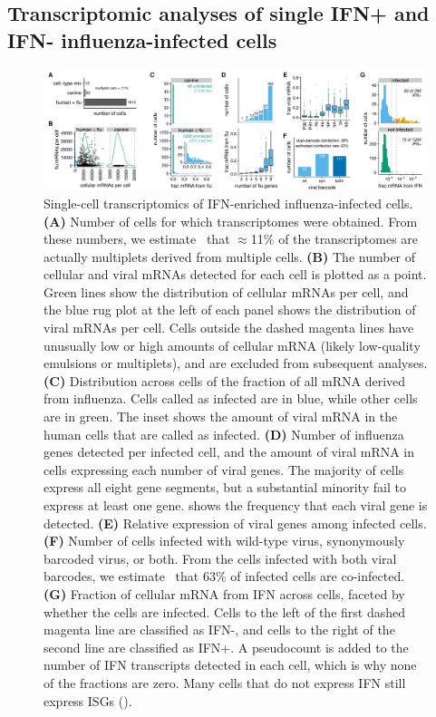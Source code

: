 \documentclass[9pt,lineno]{elife}
\begin{document}
\subsection{Transcriptomic analyses of single IFN+ and IFN- influenza-infected cells}

\begin{figure}
\begin{fullwidth}

\includegraphics[width=\linewidth, clip=false]{figures/single_cell_figures/p_cell_summary.pdf}

\caption{
Single-cell transcriptomics of IFN-enriched influenza-infected cells.
{\bf (A)} 
Number of cells for which transcriptomes were obtained.
From these numbers, we estimate~\citep{bloom2018estimating} that $\approx$11\% of the transcriptomes are actually multiplets derived from multiple cells. 
{\bf (B)} The number of cellular and viral mRNAs detected for each cell is plotted as a point.
Green lines show the distribution of cellular mRNAs per cell, and the blue rug plot at the left of each panel shows the distribution of viral mRNAs per cell.
Cells outside the dashed magenta lines have unusually low or high amounts of cellular mRNA (likely low-quality emulsions or multiplets), and are excluded from subsequent analyses.
{\bf (C)} Distribution across cells of the fraction of all mRNA derived from influenza.
Cells called as infected are in blue, while other cells are in green.
The inset shows the amount of viral mRNA in the human cells that are called as infected.
{\bf (D)} Number of influenza genes detected per infected cell, and the amount of viral mRNA in cells expressing each number of viral genes.
The majority of cells express all eight gene segments, but a substantial minority fail to express at least one gene.
 shows the frequency that each viral gene is detected.
{\bf (E)} Relative expression of viral genes among infected cells.
{\bf (F)} Number of cells infected with wild-type virus, synonymously barcoded virus, or both.
From the cells infected with both viral barcodes, we estimate~\citep{bloom2018estimating} that 63\% of infected cells are co-infected.
{\bf (G)} Fraction of cellular mRNA from IFN across cells, faceted by whether the cells are infected.
Cells to the left of the first dashed magenta line are classified as IFN-, and cells to the right of the second line are classified as IFN+.
A pseudocount is added to the number of IFN transcripts detected in each cell, which is why none of the fractions are zero.
Many cells that do not express IFN still express ISGs ().
}
\label{fig:transcriptomics}


\end{fullwidth}
\end{figure}
\end{document}
